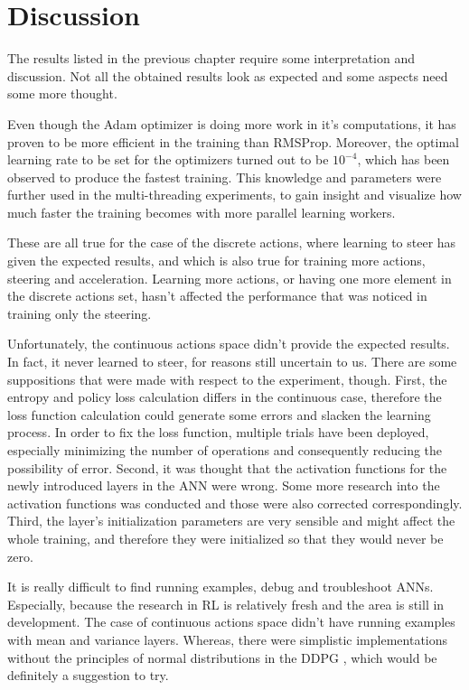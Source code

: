 \chapter{Discussion}\label{Discussion}
The results listed in the previous chapter require some interpretation and discussion. Not all the obtained results look as expected and some aspects need some more thought.

Even though the Adam optimizer is doing more work in it's computations, it has proven to be more efficient in the training than RMSProp. Moreover, the optimal learning rate to be set for the optimizers turned out to be $10^{-4}$, which has been observed to produce the fastest training. This knowledge and parameters were further used in the multi-threading experiments, to gain insight and visualize how much faster the training becomes with more parallel learning workers.

These are all true for the case of the discrete actions, where learning to steer has given the expected results, and which is also true for training more actions, steering and acceleration. Learning more actions, or having one more element in the discrete actions set, hasn't affected the performance that was noticed in training only the steering.

Unfortunately, the continuous actions space didn't provide the expected results. In fact, it never learned to steer, for reasons still uncertain to us. There are some suppositions that were made with respect to the experiment, though. First, the entropy and policy loss calculation differs in the continuous case, therefore the loss function calculation could generate some errors and slacken the learning process. In order to fix the loss function, multiple trials have been deployed, especially minimizing the number of operations and consequently reducing the possibility of error. Second, it was thought that the activation functions for the newly introduced layers in the ANN were wrong. Some more research into the activation functions was conducted and those were also corrected correspondingly. Third, the layer's initialization parameters are very sensible and might affect the whole training, and therefore they were initialized so that they would never be zero. 

It is really difficult to find running examples, debug and troubleshoot ANNs. Especially, because the research in RL is relatively fresh and the area is still in development. The case of continuous actions space didn't have running examples with mean and variance layers. Whereas, there were simplistic implementations without the principles of normal distributions in the DDPG \cite{DDPG_Torcs}, which would be definitely a suggestion to try.

